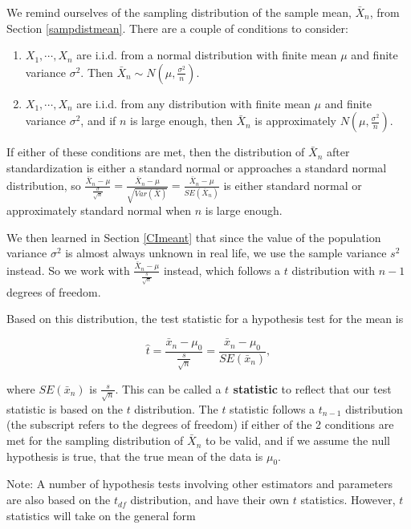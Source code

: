 \documentclass[
]{book}
\begin{document}
We remind ourselves of the sampling distribution of the sample mean, \(\bar{X}_n\), from Section \ref{sampdistmean}. There are a couple of conditions to consider:

\begin{enumerate}
\def\labelenumi{\arabic{enumi}.}
\item
  \(X_1, \cdots, X_n\) are i.i.d. from a normal distribution with finite mean \(\mu\) and finite variance \(\sigma^2\). Then \(\bar{X}_n \sim N(\mu, \frac{\sigma^2}{n})\).
\item
  \(X_1, \cdots, X_n\) are i.i.d. from any distribution with finite mean \(\mu\) and finite variance \(\sigma^2\), and if \(n\) is large enough, then \(\bar{X}_n\) is approximately \(N(\mu, \frac{\sigma^2}{n})\).
\end{enumerate}

If either of these conditions are met, then the distribution of \(\bar{X}_n\) after standardization is either a standard normal or approaches a standard normal distribution, so \(\frac{\bar{X}_n - \mu}{\frac{\sigma}{\sqrt{n}}} = \frac{\bar{X}_n - \mu}{\sqrt{Var(\bar{X})}} = \frac{\bar{X}_n - \mu}{SE(\bar{X}_n)}\) is either standard normal or approximately standard normal when \(n\) is large enough.

We then learned in Section \ref{CImeant} that since the value of the population variance \(\sigma^2\) is almost always unknown in real life, we use the sample variance \(s^2\) instead. So we work with \(\frac{\bar{X}_n - \mu}{\frac{s}{\sqrt{n}}}\) instead, which follows a \(t\) distribution with \(n-1\) degrees of freedom.

Based on this distribution, the test statistic for a hypothesis test for the mean is

\begin{equation} 
\hat{t} =  \frac{\bar{x}_n - \mu_0}{\frac{s}{\sqrt{n}}} = \frac{\bar{x}_n - \mu_0}{SE(\bar{x}_n)},
\label{eq:9-teststatMean}
\end{equation}

where \(SE(\bar{x}_n)\) is \(\frac{s}{\sqrt{n}}\). This can be called a \textbf{\(t\) statistic} to reflect that our test statistic is based on the \(t\) distribution. The \(t\) statistic follows a \(t_{n-1}\) distribution (the subscript refers to the degrees of freedom) if either of the 2 conditions are met for the sampling distribution of \(\bar{X}_n\) to be valid, and if we assume the null hypothesis is true, that the true mean of the data is \(\mu_0\).

Note: A number of hypothesis tests involving other estimators and parameters are also based on the \(t_{df}\) distribution, and have their own \(t\) statistics. However, \(t\) statistics will take on the general form
\end{document}
